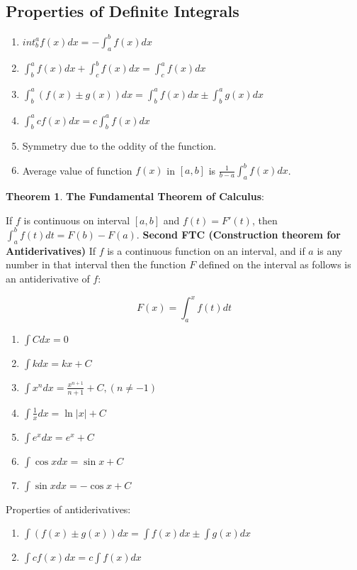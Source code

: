 \documentclass[12pt]{article}
\theoremstyle{definition}
\newtheorem{thm}{Theorem}[section]
\theoremstyle{definition}
\theoremstyle{remark}
\theoremstyle{definition}
\theoremstyle{definition}
\theoremstyle{definition}
\begin{document}
\subsection{Properties of Definite Integrals}	
	\begin{enumerate}
		\item $int^a_b f(x) dx = -\int^b_a f(x) dx$
		\item $\int^a_b f(x) dx+\int^b_c f(x) dx=\int^a_c f(x) dx$
		\item $\int^a_b (f(x)\pm g(x)) dx=\int^a_b f(x) dx \pm \int^a_b g(x) dx$
		\item $\int^a_b cf(x) dx = c \int^a_b f(x) dx$
		\item Symmetry due to the oddity of the function.
		\item Average value of function $f(x)$ in $[a,b]$ is $\frac{1}{b-a} \int_{a}^{b}f(x)dx$.
	\end{enumerate}

\begin{thm}
\textbf{The Fundamental Theorem of Calculus}:

If $f$ is continuous on interval $[a,b]$ and $f(t)=F'(t)$, then $\int^b_a f(t) dt = F(b)-F(a).$
\textbf{Second FTC (Construction theorem for Antiderivatives)}
If $f$ is a continuous function on an interval, and if $a$ is any number in that interval then the function $F$ defined on the interval as follows is an antiderivative of $f$:

\[F(x)=\int^x_a f(t) dt\]
\end{thm}

\begin{enumerate}
\item	$\int C dx = 0$
\item	$\int kdx=kx+C$
\item	$\int x^ndx=\frac{x^{n+1}}{n+1}+C, (n \neq -1)$
\item	$\int \frac{1}{x}dx = \ln|x|+C$
\item	$\int e^xdx=e^x+C $
\item	$\int \cos xdx=\sin x + C $
\item	$\int \sin xdx=-\cos x + C $

\end{enumerate}


Properties of antiderivatives:

\begin{enumerate}
\item $\int (f(x) \pm g(x))dx=\int f(x) dx \pm \int g(x) dx$
\item $\int cf(x) dx = c \int f(x) dx$
\end{enumerate}
\end{document}
